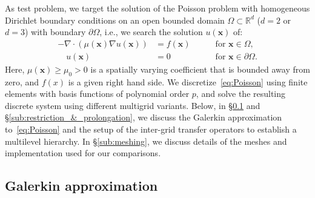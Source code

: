 \documentclass[smallcondensed,final]{svjour3}     %
\newcommand{\bs}[1]{\ensuremath{\boldsymbol #1}}
\begin{document}
As test problem, we target the solution of the Poisson problem with
homogeneous Dirichlet boundary conditions on an open bounded domain
$\Omega\subset\mathbb R^d$ ($d=2$ or $d=3$) with boundary $\partial
\Omega$, i.e., we search the solution $u(\bs x)$ of:
\begin{equation}\label{eq:Poisson}
  \begin{aligned}
    -\nabla\cdot\left(\mu(\bs x)\nabla u(\bs x)\right) &= f(\bs x) \quad &&\text{ for } \bs x\in \Omega,\\
    \quad u(\bs x)& = 0  \quad &&\text{ for } \bs x\in \partial\Omega.
  \end{aligned}
\end{equation}
Here, $\mu(\bs x)\ge \mu_0>0$ is a spatially varying coefficient that
is bounded away from zero, and $f(x)$ is a given right hand side. We
discretize~\eqref{eq:Poisson} using finite elements with basis
functions of polynomial order $p$, and solve the resulting discrete
system using different multigrid variants. Below, in
\S\ref{subsec:galerkin} and \S\ref{sub:restriction_&_prolongation}, we
discuss the Galerkin approximation to~\eqref{eq:Poisson} and the setup
of the inter-grid transfer operators to establish a multilevel
hierarchy. In \S\ref{sub:meshing}, we discuss details of the meshes
and implementation used for our comparisons.

\subsection{Galerkin approximation} \label{subsec:galerkin}
\end{document}
